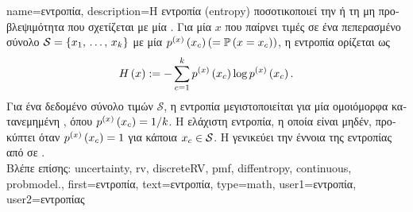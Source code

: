 {name={\foreignlanguage{greek}{εντροπία}},
	description={\foreignlanguage{greek}{Η εντροπία} (entropy) \foreignlanguage{greek}{ποσοτικοποιεί 
		την}  \foreignlanguage{greek}{ή τη μη προβλεψιμότητα 
		που σχετίζεται με μία}  \cite{coverthomas}. 
		\foreignlanguage{greek}{Για μία}  $x$ \foreignlanguage{greek}{που παίρνει 
		τιμές σε ένα πεπερασμένο σύνολο $\mathcal{S} = \{x_1, \,\ldots, \,x_k\}$ με μία}
		 $p^{(x)}\left(x_{c}\right) (=\mathbb{P}\left(x = x_{c}\right))$, 
		\foreignlanguage{greek}{η εντροπία ορίζεται ως} \cite{coverthomas}
		\[
		   H\left(x\right) := -\sum_{c=1}^{k} p^{(x)}\left(x_{c}\right)  \log p^{(x)}\left(x_{c}\right).
		\]
		\foreignlanguage{greek}{Για ένα δεδομένο σύνολο τιμών $\mathcal{S}$, η εντροπία μεγιστοποιείται για μία ομοιόμορφα 
		κατανεμημένη} , \foreignlanguage{greek}{όπου $p^{(x)}\left(x_{c}\right)=1/k$. 
		Η ελάχιστη εντροπία, η οποία είναι μηδέν, προκύπτει όταν $p^{(x)}\left(x_{c}\right)=1$ για κάποια
		$x_{c} \in \mathcal{S}$. Η}  \foreignlanguage{greek}{γενικεύει την έννοια της εντροπίας 
		από}  \foreignlanguage{greek}{σε}  . 
		\\
		\foreignlanguage{greek}{Βλέπε επίσης:} \gls{uncertainty}, \gls{rv}, \gls{discreteRV}, \gls{pmf}, \gls{diffentropy}, 
		\gls{continuous}, \gls{probmodel}.},
	first={\foreignlanguage{greek}{εντροπία}},
	text={\foreignlanguage{greek}{εντροπία}},
	type=math,
	user1={\foreignlanguage{greek}{εντροπία}}, %
  	user2={\foreignlanguage{greek}{εντροπίας}} %
}

